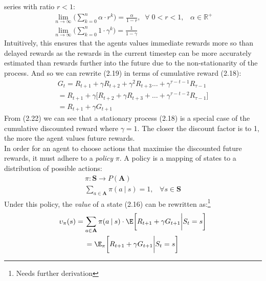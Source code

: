 series with ratio $r < 1$:
\begin{equation}
    \begin{gathered}
        \lim_{n \rightarrow \infty} \biggl( \sum_{k= 0}^{n} \alpha \cdot r^k \biggl) = \frac{\alpha}{1-r}, \;\; \forall \; 0 < r < 1, \;\;\; \alpha \in \mathbb{R}^+ \\
    \lim_{n \rightarrow \infty}\biggl(\sum_{k=0}^n 1 \cdot \gamma^k \biggl) = \frac{1}{1 - \gamma}
    \end{gathered}
\end{equation}
Intuitively, this ensures that the agents values immediate rewards more so than delayed rewards as
the rewards in the current timestep can be more accurately estimated than rewards further into 
the future due to the non-stationarity of the process.
And so we can rewrite (2.19) in terms of cumulative reward (2.18):
\begin{equation}
    \begin{gathered}
        G_t = R_{t+1} + \gamma R_{t+2} + \gamma^2 R_{t+3} \hdots + \gamma^{\tau-t-1}R_{\tau-1}\\
        = R_{t+1} + \gamma \biggl[R_{t+2} + \gamma R_{t+3} + \hdots +\gamma^{\tau-t-2}R_{\tau-1} \biggl] \\
        = R_{t+1} + \gamma G_{t+1}
    \end{gathered}
\end{equation}
From (2.22) we can see that a stationary process (2.18) is a special case of the cumulative
discounted reward where $\gamma = 1$. The closer the discount factor is to 1, the more
the agent values future rewards.\\
In order for an agent to choose actions that maximise the discounted future rewards, it 
must adhere to a \emph{policy} $\pi$. A policy is a mapping of states to a distribution
of possible actions:
\begin{equation}
    \begin{gathered}
        \pi: \mathbf{S} \rightarrow P(\mathbf{A}) \\
        \sum_{a \in \mathbf{A}} \pi(a \: | \: s) = 1, \;\;\; \forall s \in \mathbf{S}
    \end{gathered}
\end{equation}
Under this policy, the \emph{value} of a state (2.16) can be rewritten as:\footnote{Needs further derivation}
\begin{equation}
    \begin{gathered}
        \upsilon_\pi(s) = \sum_{a \in \mathbf{A}}\pi(a \: | \:s) \cdot \E \biggl [R_{t+1} + \gamma G_{t+1} \biggl | S_t = s \biggl] \\
        = \E_\pi \biggl [R_{t+1} + \gamma G_{t+1} \biggl | S_t = s \biggl]
    \end{gathered} 
\end{equation}
